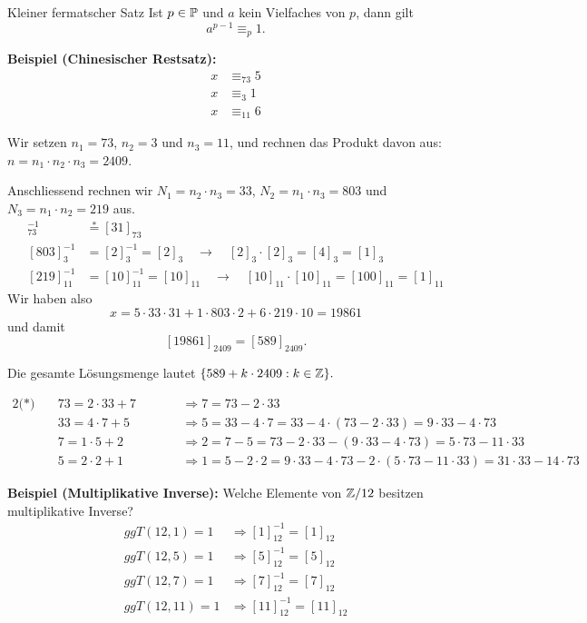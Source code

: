 \begin{definition}{Kleiner fermatscher Satz}
    Ist $p \in \P$ und $a$ kein Vielfaches von $p$, dann gilt \[a^{p-1} \equiv_p 1.\]
\end{definition}

\textbf{Beispiel (Chinesischer Restsatz):}
\begin{align*}
    x &\equiv_{73} 5 \\
    x &\equiv_{3} 1 \\
    x &\equiv_{11} 6
\end{align*}

Wir setzen $n_1 = 73$, $n_2 = 3$ und $n_3 = 11$, und rechnen das Produkt davon aus: $n = n_1 \cdot n_2 \cdot n_3 = 2409$.

Anschliessend rechnen wir $N_1 = n_2 \cdot n_3 = 33$, $N_2 = n_1 \cdot n_3 = 803$ und $N_3 = n_1 \cdot n_2 = 219$ aus.
\begin{align*}
[33]
    _{73}^{-1} &\stackrel{*}{=} [31]_{73} \\
    [803]_3^{-1} &= [2]_3^{-1} = [2]_3 \quad \longrightarrow \quad [2]_3 \cdot [2]_3 = [4]_3 = [1]_3 \\
    [219]_{11}^{-1} &= [10]_{11}^{-1} = [10]_{11} \quad \longrightarrow \quad [10]_{11} \cdot [10]_{11} = [100]_{11} = [1]_{11}
\end{align*}
Wir haben also \[x = 5 \cdot 33 \cdot 31 + 1 \cdot 803 \cdot 2 + 6 \cdot 219 \cdot 10 = 19861\] und damit \[[19861]_{2409} = [589]_{2409}.\]

Die gesamte Lösungsmenge lautet $\{ 589 + k \cdot 2409 : k \in \Z \}.$

\begin{alignat*}{2}
    \text{(*)}\quad &73 = 2 \cdot 33 + 7 \quad \quad &&\Rightarrow 7 = 73 - 2 \cdot 33 \\
    &33 = 4 \cdot 7 + 5 &&\Rightarrow 5 = 33 - 4 \cdot 7 = 33 - 4 \cdot (73 - 2 \cdot 33) = 9 \cdot 33 - 4 \cdot 73 \\
    &7 = 1 \cdot 5 + 2 &&\Rightarrow 2 = 7 - 5 = 73 - 2 \cdot 33 - (9 \cdot 33 - 4 \cdot 73) = 5 \cdot 73 - 11 \cdot 33 \\
    &5 = 2 \cdot 2 + 1 &&\Rightarrow 1 = 5 - 2 \cdot 2 = 9 \cdot 33 - 4 \cdot 73 - 2 \cdot (5 \cdot 73 - 11 \cdot 33) = 31 \cdot 33 - 14 \cdot 73
\end{alignat*}

\textbf{Beispiel (Multiplikative Inverse):} Welche Elemente von $\Z/12$ besitzen multiplikative Inverse?
\begin{align*}
    ggT(12,1) = 1 &\Rightarrow [1]_{12}^{-1} = [1]_{12} \\
    ggT(12,5) = 1 &\Rightarrow [5]_{12}^{-1} = [5]_{12} \\
    ggT(12,7) = 1 &\Rightarrow [7]_{12}^{-1} = [7]_{12} \\
    ggT(12,11) = 1 &\Rightarrow [11]_{12}^{-1} = [11]_{12}
\end{align*}

